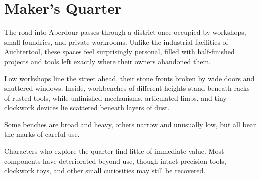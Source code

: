 \section*{ Maker's Quarter}
{\entryfont The road into Aberdour passes through a district once occupied by workshops, small foundries, and private workrooms. Unlike the industrial facilities of Auchtertool, these spaces feel surprisingly personal, filled with half-finished projects and tools left exactly where their owners abandoned them.}
\begin{DndReadAloud}
	Low workshops line the street ahead, their stone fronts broken by wide doors and shuttered windows. Inside, workbenches of different heights stand beneath racks of rusted tools, while unfinished mechanisms, articulated limbs, and tiny clockwork devices lie scattered beneath layers of dust.

	Some benches are broad and heavy, others narrow and unusually low, but all bear the marks of careful use.
\end{DndReadAloud}
{\noindent\entryfont Characters who explore the quarter find little of immediate value. Most components have deteriorated beyond use, though intact precision tools, clockwork toys, and other small curiosities may still be recovered.}